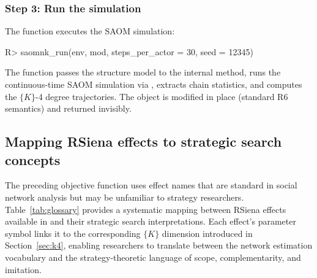 \documentclass[
  article]{jss}
\begin{document}
\subsubsection{Step 3: Run the
simulation}\label{step-3-run-the-simulation}

The  function executes the SAOM simulation:

\begin{CodeChunk}
\begin{CodeInput}
R> saomnk_run(env, mod, steps_per_actor = 30, seed = 12345)
\end{CodeInput}
\end{CodeChunk}

The function passes the structure model to the internal
 method, runs the continuous-time SAOM simulation
via , extracts chain statistics, and computes the
\(\{K\}\)-4 degree trajectories. The  object is modified in
place (standard R6 semantics) and returned invisibly.

\subsection{Mapping RSiena effects to strategic search
concepts}\label{sec:glossary}

The preceding objective function uses  effect names that are
standard in social network analysis but may be unfamiliar to strategy
researchers. Table~\ref{tab:glossary} provides a systematic mapping
between RSiena effects available in  and their strategic
search interpretations. Each effect's parameter symbol links it to the
corresponding \(\{K\}\) dimension introduced in Section~\ref{sec:k4},
enabling researchers to translate between the network estimation
vocabulary and the strategy-theoretic language of scope,
complementarity, and imitation.
\end{document}
